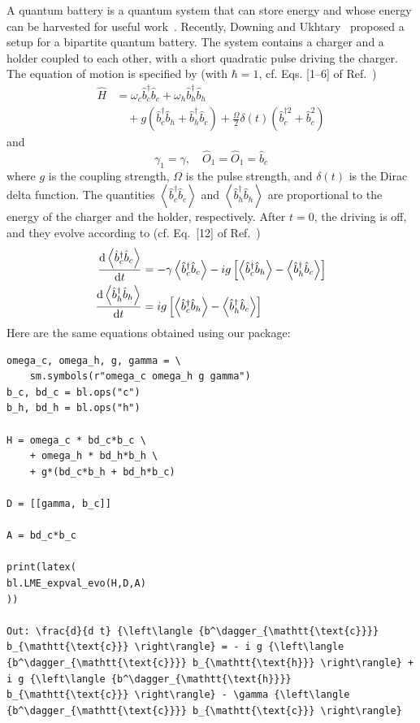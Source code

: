 \documentclass[onecolumn, 12pt, sort&compress]{elsarticle}
\newcommand{\expval}[1]{\left\langle{#1}\right\rangle}
\newcommand{\bop}{\hat{b}}
\newcommand{\bdag}{\bop^\dagger}
\newcommand{\bdagn}[1]{\bop^{\dagger {#1}}}
\begin{document}
A quantum battery is a quantum system that can store energy and whose energy can be harvested for useful work~\cite{downing_hyperbolic_2024}. Recently, Downing and Ukhtary~\cite{downing_hyperbolic_2024} proposed a setup for a bipartite quantum battery. The system contains a charger and a holder coupled to each other, with a short quadratic pulse driving the charger. The equation of motion is specified by (with $\hbar=1$, cf. Eqs. [1--6] of Ref.~\cite{downing_hyperbolic_2024})
\begin{equation}
\begin{split}
    \hat{H} &= \omega_c \bdag_c\bop_c + \omega_h\bdag_h\bop_h \\
    &\quad + g\left(\bdag_c\bop_h+\bdag_h\bop_c\right) + \frac{\Omega}{2}\delta(t)\left(\bdagn{2}_c+\bop^2_c\right)
\end{split}
\end{equation}
and
\begin{equation}
    \gamma_1 = \gamma, \quad \hat{O}_1 =\hat{O}_1= \bop_c
\end{equation}
where $g$ is the coupling strength, $\Omega$ is the pulse strength, and $\delta(t)$ is the Dirac delta function. The quantities $\expval{\bdag_c\bop_c}$ and $\expval{\bdag_h\bop_h}$ are proportional to the energy of the charger and the holder, respectively. After $t=0$, the driving is off, and they evolve according to (cf. Eq.~[12] of Ref.~\cite{downing_hyperbolic_2024})
\begin{subequations}
\begin{align}
\odv{\expval{\bdag_c\bop_c}}{t} &= -\gamma \expval{\bdag_c\bop_c} - ig\left[\expval{\bdag_c\bop_h}-\expval{\bdag_h\bop_c}\right]  
\\
\odv{\expval{\bdag_h\bop_h}}{t} &= ig\left[\expval{\bdag_c\bop_h} - \expval{\bdag_h\bop_c}\right]
\end{align}
\end{subequations}
Here are the same equations obtained using our package:
\begin{verbatim}
omega_c, omega_h, g, gamma = \
    sm.symbols(r"omega_c omega_h g gamma")
b_c, bd_c = bl.ops("c")
b_h, bd_h = bl.ops("h")

H = omega_c * bd_c*b_c \
    + omega_h * bd_h*b_h \
    + g*(bd_c*b_h + bd_h*b_c)

D = [[gamma, b_c]]

A = bd_c*b_c

print(latex(
bl.LME_expval_evo(H,D,A)
))

Out: \frac{d}{d t} {\left\langle {b^\dagger_{\mathtt{\text{c}}}} b_{\mathtt{\text{c}}} \right\rangle} = - i g {\left\langle {b^\dagger_{\mathtt{\text{c}}}} b_{\mathtt{\text{h}}} \right\rangle} + i g {\left\langle {b^\dagger_{\mathtt{\text{h}}}} b_{\mathtt{\text{c}}} \right\rangle} - \gamma {\left\langle {b^\dagger_{\mathtt{\text{c}}}} b_{\mathtt{\text{c}}} \right\rangle}
\end{verbatim}
\end{document}
